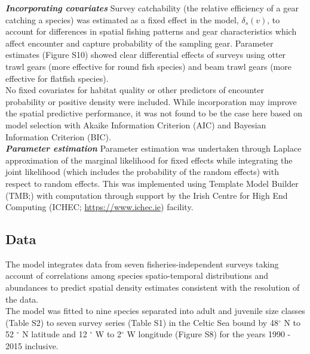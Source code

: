 \documentclass[fleqn,10pt]{wlscirep}
\begin{document}
\begin{linenumbers}
\textbf{\textit{Incorporating covariates}} Survey catchability (the relative
efficiency of a gear catching a species) was estimated as a fixed effect
in the model, $\delta_{s}(v)$, to account for differences in spatial fishing
patterns and gear characteristics which affect encounter and capture
probability of the sampling gear\cite{Thorson2014}. Parameter estimates
(Figure S10) showed clear differential effects of surveys using otter trawl
gears (more effective for round fish species) and beam trawl gears (more
effective for flatfish species).\\

No fixed covariates for habitat quality or other predictors of encounter
probability or positive density were included. While incorporation may improve
the spatial predictive performance\cite{Thorson2017}, it was not found to be
the case here based on model selection with Akaike Information Criterion (AIC)
and Bayesian Information Criterion (BIC).\\

\textbf{\textit{Parameter estimation}} Parameter estimation was undertaken
through Laplace approximation of the marginal likelihood for fixed effects
while integrating the joint likelihood (which includes the probability of the
random effects) with respect to random effects. This was implemented using
Template Model Builder (TMB;\cite{Kristensen2015}) with computation through
support by the Irish Centre for High End Computing (ICHEC;
\url{https://www.ichec.ie}) facility.  \\

\subsection*{Data\\}

The model integrates data from seven fisheries-independent surveys taking
account of correlations among species spatio-temporal distributions and
abundances to predict spatial density estimates consistent with the resolution
of the data. \\

The model was fitted to nine species separated into adult and juvenile size
classes (Table S2) to seven survey series (Table S1) in the Celtic Sea bound by
48$^{\circ}$ N to 52 $^{\circ}$ N latitude and 12 $^{\circ}$ W to 2$^{\circ}$ W
longitude (Figure S8) for the years 1990 - 2015 inclusive. \\


\end{linenumbers}
\end{document}
